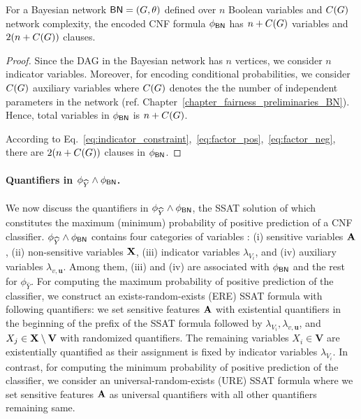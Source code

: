 \begin{lemma}
	For a Bayesian network $ \mathsf{BN} = (G, \theta) $ defined over $ n $ Boolean variables and $ C(G) $ network complexity, the encoded CNF formula $ \phi_{\mathsf{BN}} $ has $ n + C(G) $  variables and $ 2(n + C(G)) $ clauses. 
\end{lemma}
\begin{proof}
	Since the DAG in the Bayesian network has $ n $ vertices, we consider $ n $ indicator variables. Moreover, for encoding conditional probabilities, we consider $ C(G) $ auxiliary variables where $ C(G) $ denotes the the number of independent parameters in the network (ref. Chapter~\ref{chapter_fairness_preliminaries_BN}). Hence, total variables in $ \phi_{\mathsf{BN}} $ is $ n + C(G)  $.
	
	According to Eq.~\eqref{eq:indicator_constraint},~\eqref{eq:factor_pos},~\eqref{eq:factor_neg}, there are $2( n + C(G)) $ clauses in $ \phi_{\mathsf{BN}} $.
	
	
\end{proof}



\paragraph{Quantifiers in $ \phi_{\widehat{Y}} \wedge \phi_{\mathsf{BN}} $.}
We now discuss the quantifiers in $ \phi_{\widehat{Y}} \wedge \phi_{\mathsf{BN}} $, the SSAT solution of which  constitutes the maximum (minimum) probability of positive prediction of a CNF classifier. $ \phi_{\widehat{Y}} \wedge \phi_{\mathsf{BN}} $ contains four  categories of variables : (i) sensitive variables $ \mathbf{A} $, (ii) non-sensitive variables $ \mathbf{X} $, (iii) indicator variables $  \lambda_{V_i} $, and (iv) auxiliary variables $ \lambda_{v,\mathbf{u}} $. Among them, (iii) and (iv) are associated with $ \phi_{\mathsf{BN}} $ and the rest for $ \phi_{\widehat{Y}} $. For computing the maximum probability of positive prediction of the classifier, we construct  an exists-random-exists (ERE) SSAT formula with following quantifiers: we set sensitive features $ \mathbf{A} $ with existential quantifiers in the beginning of the prefix of the SSAT formula followed by $  \lambda_{V_i}, \lambda_{v,\mathbf{u}} $, and $ X_j \in \mathbf{X} \setminus \mathbf{V} $ with randomized quantifiers. The remaining variables  $ X_i \in \mathbf{V} $ are existentially quantified as their assignment is fixed by indicator variables $ \lambda_{V_i} $. In contrast, for computing the minimum probability of positive prediction of the classifier, we consider an universal-random-exists (URE) SSAT formula  where we set sensitive features $ \mathbf{A} $ as universal quantifiers with all other quantifiers remaining same.
